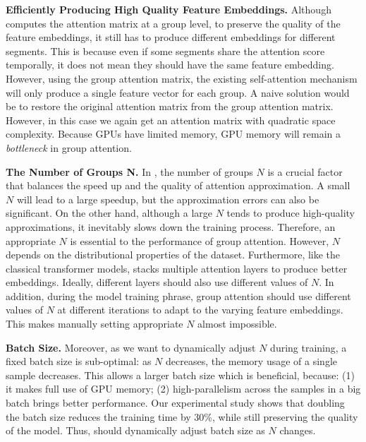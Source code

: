 \begin{compactitem}
\item \textbf{Efficiently Producing High Quality Feature Embeddings.} Although \system computes the attention matrix at a group level, to preserve the quality of the feature embeddings, it still has to produce different embeddings for different segments. This is because even if some segments share the attention score temporally, it does not mean they should have the same feature embedding. However, using the group attention matrix, the existing self-attention mechanism will only produce a single feature vector for each group. A naive solution would be to restore the original attention matrix from the group attention matrix. 
However, in this case we again get an attention matrix with quadratic space complexity. Because GPUs have limited memory, GPU memory will remain a {\it bottleneck} in group attention. 


\item \textbf{The Number of Groups N.} In \system, the number of groups $N$ is a crucial factor that balances the speed up and the quality of attention approximation. A small $N$ will lead to a large speedup, but the approximation errors can also be significant. On the other hand, although a large $N$ tends to produce high-quality approximations, it inevitably slows down the training process. Therefore, an appropriate $N$ is essential to the performance of group attention. However, $N$ depends on the distributional properties of the dataset. Furthermore, like the classical transformer models, \system stacks multiple attention layers to produce better embeddings. Ideally, different layers should also use different values of $N$. In addition, during the model training phrase, group attention should use different values of $N$ at different iterations to adapt to the varying feature embeddings.
This makes manually setting appropriate $N$ almost impossible. 

\item \textbf{Batch Size.} Moreover, as we want to dynamically adjust $N$ during training, a fixed batch size is sub-optimal: as $N$ decreases, the memory usage of a single sample decreases. This allows a larger batch size which is beneficial, because: 
(1) it makes full use of GPU memory; (2) high-parallelism across the samples in a big batch brings better performance. 
Our experimental study shows that doubling the batch size reduces the training time by 30\%, while still preserving the quality of the model. Thus, \system should dynamically adjust batch size as $N$ changes.
\end{compactitem}

